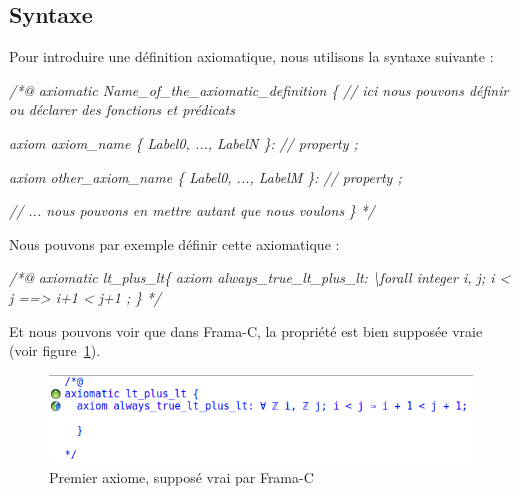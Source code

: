 \documentclass[12pt,francais,]{scrbook}
\newenvironment{Shaded}{}{}
\newcommand{\CommentTok}[1]{\textcolor[rgb]{0.38,0.63,0.69}{\textit{{#1}}}}
\begin{document}
\subsection{Syntaxe}\label{syntaxe-3}

Pour introduire une définition axiomatique, nous utilisons la syntaxe
suivante :

\begin{footnotesize}\begin{Shaded}
\begin{Highlighting}[]
\CommentTok{/*@}
\CommentTok{  axiomatic Name_of_the_axiomatic_definition \{}
\CommentTok{    // ici nous pouvons définir ou déclarer des fonctions et prédicats}

\CommentTok{    axiom axiom_name \{ Label0, ..., LabelN \}:}
\CommentTok{      // property ;}

\CommentTok{    axiom other_axiom_name \{ Label0, ..., LabelM \}:}
\CommentTok{      // property ;}

\CommentTok{    // ... nous pouvons en mettre autant que nous voulons}
\CommentTok{  \}}
\CommentTok{*/}
\end{Highlighting}
\end{Shaded}\end{footnotesize}

Nous pouvons par exemple définir cette axiomatique :

\begin{footnotesize}\begin{Shaded}
\begin{Highlighting}[]
\CommentTok{/*@}
\CommentTok{  axiomatic lt_plus_lt\{}
\CommentTok{    axiom always_true_lt_plus_lt:}
\CommentTok{      \textbackslash{}forall integer i, j; i < j ==> i+1 < j+1 ;}
\CommentTok{  \}}
\CommentTok{*/}
\end{Highlighting}
\end{Shaded}\end{footnotesize}

Et nous pouvons voir que dans Frama-C, la propriété est bien supposée
vraie (voir figure~\ref{fig:5-1-1-fst-axiom}).

\begin{figure}[htbp]
\centering
\includegraphics[scale=0.5]{5-1-1-premier-axiome.png}
\caption{Premier axiome, supposé vrai par Frama-C}
\label{fig:5-1-1-fst-axiom}
\end{figure}
\end{document}
